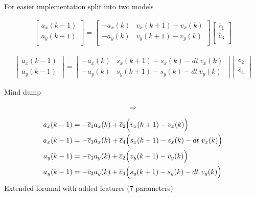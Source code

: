 \documentclass[10pt]{article}         %
\begin{document}
For easier implementation split into two models

\begin{align}
    \begin{bmatrix}
        a_x(k-1) \\ 
        a_y(k-1) \\ 
    \end{bmatrix}
    =
    \begin{bmatrix}
        -a_x(k)  & v_x(k+1) - v_x(k)   \\ 
        -a_y(k)  & v_y(k+1) - v_y(k)   \\
    \end{bmatrix}
    \begin{bmatrix}
        \overline c_1 \\
        \overline c_3 \\
   \end{bmatrix}
\end{align}



\begin{align}
    \begin{bmatrix}
        a_x(k-1) \\ 
        a_y(k-1)       
    \end{bmatrix}
    =
    \begin{bmatrix}
        -a_x(k) &    s_x(k+1) - s_x(k) - dt \  v_x(k)   \\ 
        -a_y(k) &    s_y(k+1) - s_y(k) - dt \  v_y(k)
    \end{bmatrix}
    \begin{bmatrix}
        \overline c_2 \\
        \overline c_4 \\
   \end{bmatrix}
\end{align}

Mind dump


\begin{align}
\Rightarrow
\end{align}



\begin{align}
a_x(k-1) &= - \overline c_1 a_x(k)  + \overline c_2 \Bigl(v_x(k+1) - v_x(k)\Bigr)  \\
a_x(k-1) &= - \overline c_3 a_x(k)  + \overline c_4 \Bigl(s_x(k+1) - s_x(k) - dt \  v_x(k)\Bigr) \\
a_y(k-1) &= - \overline c_1 a_y(k)  + \overline c_2 \Bigl(v_y(k+1) - v_y(k)\Bigr)  \\
a_y(k-1) &= - \overline c_3 a_y(k)  + \overline c_4 \Bigl(s_y(k+1) - s_y(k) - dt \  v_y(k)\Bigr)
\end{align}
Extended forumal with added features (7 parameters)
\end{document}
